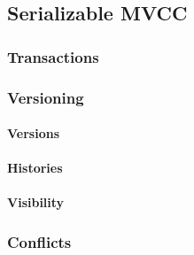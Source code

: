 
\subsection{Serializable MVCC}
\label{ch:impl-mvcc}

\subsubsection{Transactions}

\subsubsection{Versioning}
\paragraph{Versions}
\paragraph{Histories}
\paragraph{Visibility}

\subsubsection{Conflicts}
